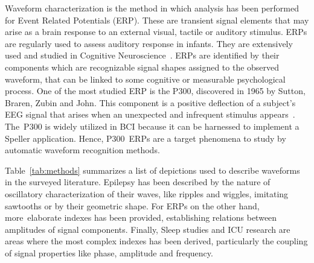 \documentclass[brainsci,article,accept,moreauthors,pdftex,10pt,a4paper]{mdpi}
\begin{document}
Waveform characterization is the method in which analysis has been performed for Event Related Potentials (ERP).  These are transient signal elements that may arise as a brain response to an external visual, tactile or auditory stimulus.  ERPs are regularly used to assess auditory response in infants.  They are extensively used and studied in Cognitive Neuroscience~\citep{Luck2005}.  ERPs are identified by their components which are recognizable signal shapes assigned to the observed waveform, that can be linked to some cognitive or measurable psychological process.   One of the most studied ERP is the P300, discovered in 1965 by Sutton, Braren, Zubin and John.  This component is a positive deflection of a subject's EEG signal that arises when an unexpected and infrequent stimulus appears~\citep{Wolpaw2002}.  The~P300 is widely utilized in BCI because it can be harnessed to implement a Speller application.  Hence, P300~ERPs are a target phenomena to study by automatic waveform recognition methods.

Table~\ref{tab:methods} summarizes a list of depictions used to describe waveforms in the surveyed literature.  Epilepsy has been described by the nature of oscillatory characterization of their waves, like ripples and wiggles, imitating sawtooths or by their geometric shape.  For ERPs on the other hand, more~elaborate indexes has been provided, establishing relations between amplitudes of signal components.  Finally, Sleep studies and ICU research are areas where the most complex indexes has been derived, particularly the coupling of signal properties like phase, amplitude and frequency.



%
%

\end{document}
